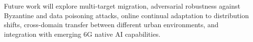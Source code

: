 \documentclass[10pt,letterpaper]{article}
\begin{document}
Future work will explore multi-target migration, adversarial robustness against Byzantine and data poisoning attacks, online continual adaptation to distribution shifts, cross-domain transfer between different urban environments, and integration with emerging 6G native AI capabilities.





\end{document}
